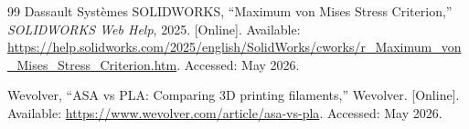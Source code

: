\begin{thebibliography}{99}
Dassault Syst\`emes SOLIDWORKS, ``Maximum von Mises Stress Criterion,'' \textit{SOLIDWORKS Web Help}, 2025. [Online]. Available: \url{https://help.solidworks.com/2025/english/SolidWorks/cworks/r_Maximum_von_Mises_Stress_Criterion.htm}. Accessed: May 2026.

Wevolver, ``ASA vs PLA: Comparing 3D printing filaments,'' Wevolver. [Online]. Available: \url{https://www.wevolver.com/article/asa-vs-pla}. Accessed: May 2026.
\end{thebibliography}